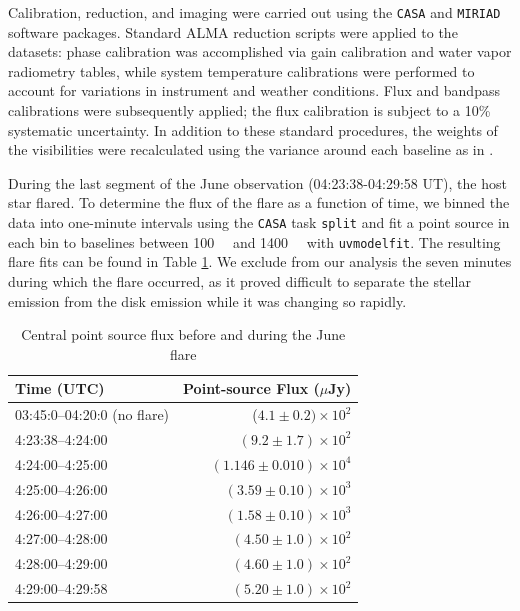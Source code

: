 \documentclass[modern]{aastex62}
\begin{document}
Calibration, reduction, and imaging were carried out using the \texttt{CASA} \citep{mcmullin07} and \texttt{MIRIAD} \citep{sault95} software packages. 
Standard ALMA reduction scripts were applied to the datasets: phase calibration was accomplished via gain calibration and water vapor radiometry tables, while system temperature calibrations were performed to account for variations in instrument and weather conditions. 
Flux and bandpass calibrations were subsequently applied; the flux calibration is subject to a 10\% systematic uncertainty.
In addition to these standard procedures, the weights of the visibilities were recalculated using the variance around each baseline as in \cite{flaherty17}.


During the last segment of the June observation (04:23:38-04:29:58 UT), the host star flared. 
To determine the flux of the flare as a function of time, we binned the data into one-minute intervals using the \texttt{CASA} task \texttt{split} and fit a point source in each bin to baselines between \SI{100}{\kilo \lambda} and \SI{1400}{\kilo \lambda} with \texttt{uvmodelfit}. 
The resulting flare fits can be found in Table \ref{tab:flare fluxes}. 
We exclude from our analysis the seven minutes during which the flare occurred, as it proved difficult to separate the stellar emission from the disk emission while it was changing so rapidly.

\begin{table}	
  \centering
  \begin{tabular}{lr}
    \toprule
    Time (UTC) & Point-source Flux ($\mu$Jy) \\
    \midrule
    03:45:0--04:20:0 (no flare) & ($4.1 \pm 0.2)  \times 10^2$\\
  	4:23:38--4:24:00 & $(9.2 \pm 1.7) \times 10^2$ \\
  	4:24:00--4:25:00 & $(1.146 \pm 0.010) \times 10^4$ \\
  	4:25:00--4:26:00 & $(3.59 \pm 0.10) \times 10^3$ \\
  	4:26:00--4:27:00 & $(1.58 \pm 0.10) \times 10^3$ \\
  	4:27:00--4:28:00 & $(4.50 \pm 1.0) \times 10^2$ \\
  	4:28:00--4:29:00 & $(4.60 \pm 1.0) \times 10^2$ \\
  	4:29:00--4:29:58 & $(5.20 \pm 1.0) \times 10^2$\\
    \bottomrule
  \end{tabular}
	\caption{Central point source flux before and during the June flare}
  \label{tab:flare fluxes}
\end{table}
\end{document}
